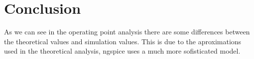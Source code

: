 \section{Conclusion}
\label{sec:conclusion}

As we can see in the operating point analysis there are some differences between the theoretical values and simulation values. This is due to the aproximations used in the theoretical analysis, ngspice uses a much more sofisticated model.